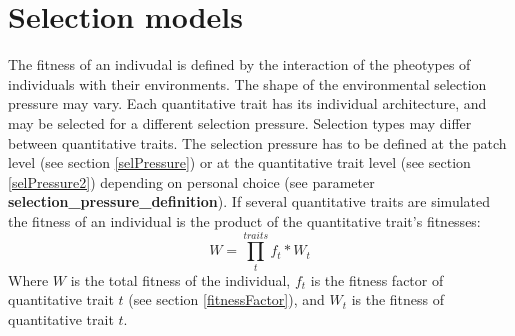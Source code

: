 \documentclass[letterpaper,12pt,oneside]{book}
\begin{document}
\section{Selection models}\label{selectionModels}
The fitness of an indivudal is defined by the interaction of the pheotypes of individuals
with their environments. The shape of the environmental selection pressure may vary. Each
quantitative trait has its individual architecture, and may be selected for a different selection
pressure. Selection types may differ between quantitative traits. The selection pressure has to be
defined at the patch level (see section \ref{selPressure}) or at the quantitative trait
level (see section \ref{selPressure2}) depending on personal choice (see parameter
\textbf{selection\_pressure\_definition}). If several quantitative traits are simulated the fitness
of an individual is the product of the quantitative trait's fitnesses:
	\[W = \prod_{t}^{traits}f_{t}*W_{t}\]
Where $W$ is the total fitness of the individual, $f_{t}$ is the fitness factor of quantitative
trait $t$ (see section \ref{fitnessFactor}), and $W_{t}$ is the fitness of quantitative trait $t$.
\end{document}
